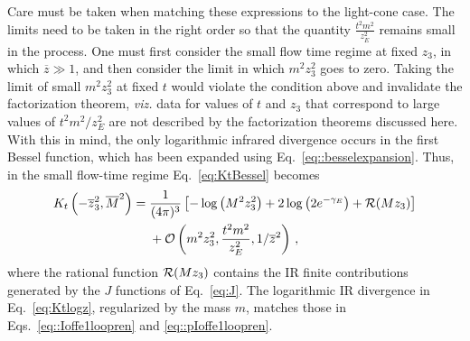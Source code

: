 Care must be taken when matching these expressions to the light-cone case. The
limits need to be taken in the right order so that the quantity $\frac{t^2
m^2}{z_E^2}$ remains small in the process. One must first consider the small
flow time regime at fixed $z_3$, in which $\overline{z}\gg 1$, and then consider
the limit in which $m^2 z_3^2$ goes to zero. Taking the limit of small $m^2
z_3^2$ at fixed $t$ would violate the condition above and invalidate the
factorization theorem, {\em viz.} data for values of $t$ and $z_3$ that
correspond to large values of $t^2 m^2/z_E^2$ are not described by the
factorization theorems discussed here. With this in mind, the only logarithmic
infrared divergence occurs in the first Bessel function, which has been expanded
using Eq.~\eqref{eq::besselexpansion}. Thus, in the small flow-time regime
Eq.~\eqref{eq:KtBessel} becomes
\begin{align}
        \label{eq:Ktlogz}
        K_t\left(-\overline{z}_3^2, \overline{M}^2\right) = {} & 
        \frac{1}{(4\pi)^3} %
        \left[-\log\left( M^2 z_3^2\right)+ 2 \log\left(2e^{-\gamma_E}\right) + 
                {\cal R}(Mz_3)\right] \nonumber \\
                & {} + \mathcal{O}\left(m^2z_3^2,
                        \frac{t^2 m^2}{z_E^2},1/\overline{z}^2\right)\,,
\end{align}
where the rational function ${\cal R}(Mz_3)$ contains the IR finite contributions 
generated by the $J$ functions of Eq.~\eqref{eq:J}.
The logarithmic IR divergence in Eq.~\eqref{eq:Ktlogz}, regularized by the mass $m$, matches those in Eqs.~\eqref{eq::Ioffe1loopren} and \eqref{eq::pIoffe1loopren}. 

